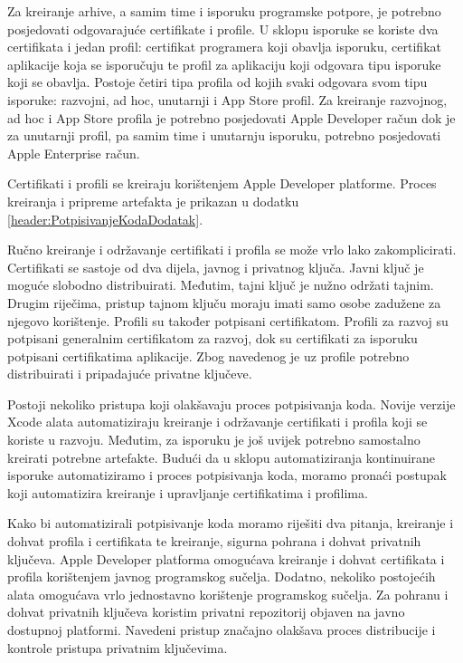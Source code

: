 \documentclass[times, utf8, diplomski, numeric]{fer}
\begin{document}
Za kreiranje arhive, a samim time i isporuku programske potpore, je potrebno posjedovati odgovarajuće certifikate i profile. U sklopu isporuke se koriste dva certifikata i jedan profil: certifikat programera koji obavlja isporuku, certifikat aplikacije koja se isporučuju te profil za aplikaciju koji odgovara tipu isporuke koji se obavlja\citep{codesigning}. Postoje četiri tipa profila od kojih svaki odgovara svom tipu isporuke: razvojni, ad hoc, unutarnji i App Store profil. Za kreiranje razvojnog, ad hoc i App Store profila je potrebno posjedovati Apple Developer račun dok je za unutarnji profil, pa samim time i unutarnju isporuku, potrebno posjedovati Apple Enterprise račun.

Certifikati i profili se kreiraju korištenjem Apple Developer platforme. Proces kreiranja i pripreme artefakta je prikazan u dodatku \ref{header:PotpisivanjeKodaDodatak}.

Ručno kreiranje i održavanje certifikati i profila se može vrlo lako zakomplicirati. Certifikati se sastoje od dva dijela, javnog i privatnog ključa. Javni ključ je moguće slobodno distribuirati. Međutim, tajni ključ je nužno održati tajnim. Drugim riječima, pristup tajnom ključu moraju imati samo osobe zadužene za njegovo korištenje. Profili su također potpisani certifikatom. Profili za razvoj su potpisani generalnim certifikatom za razvoj, dok su certifikati za isporuku potpisani certifikatima aplikacije. Zbog navedenog je uz profile potrebno distribuirati i pripadajuće privatne ključeve.

Postoji nekoliko pristupa koji olakšavaju proces potpisivanja koda. Novije verzije Xcode alata automatiziraju kreiranje i održavanje certifikati i profila koji se koriste u razvoju. Međutim, za isporuku je još uvijek potrebno samostalno kreirati potrebne artefakte. Budući da u sklopu automatiziranja kontinuirane isporuke automatiziramo i proces potpisivanja koda, moramo pronaći postupak koji automatizira kreiranje i upravljanje certifikatima i profilima.

Kako bi automatizirali potpisivanje koda moramo riješiti dva pitanja, kreiranje i dohvat profila i certifikata te kreiranje, sigurna pohrana i dohvat privatnih ključeva. Apple Developer platforma omogućava kreiranje i dohvat certifikata i profila korištenjem javnog programskog sučelja. Dodatno, nekoliko postojećih alata omogućava vrlo jednostavno korištenje programskog sučelja. Za pohranu i dohvat privatnih ključeva koristim privatni repozitorij objaven na javno dostupnoj platformi. Navedeni pristup značajno olakšava proces distribucije i kontrole pristupa privatnim ključevima.
\end{document}
